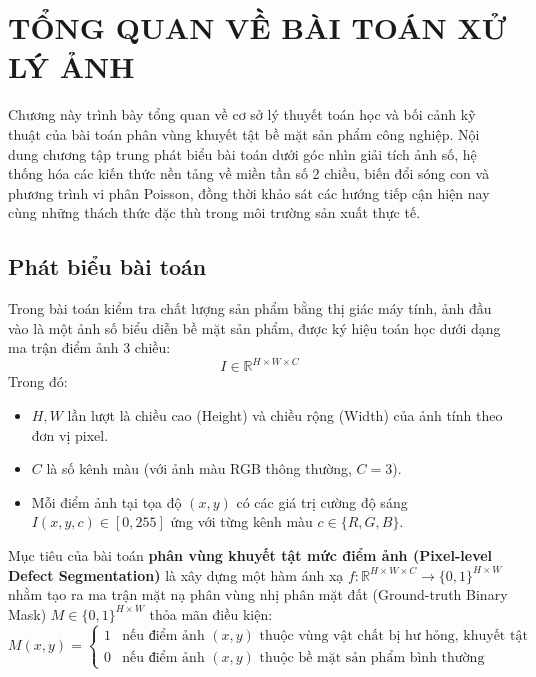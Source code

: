 \chapter{TỔNG QUAN VỀ BÀI TOÁN XỬ LÝ ẢNH}

Chương này trình bày tổng quan về cơ sở lý thuyết toán học và bối cảnh kỹ thuật của bài toán phân vùng khuyết tật bề mặt sản phẩm công nghiệp. Nội dung chương tập trung phát biểu bài toán dưới góc nhìn giải tích ảnh số, hệ thống hóa các kiến thức nền tảng về miền tần số 2 chiều, biến đổi sóng con và phương trình vi phân Poisson, đồng thời khảo sát các hướng tiếp cận hiện nay cùng những thách thức đặc thù trong môi trường sản xuất thực tế.

\section{Phát biểu bài toán}

Trong bài toán kiểm tra chất lượng sản phẩm bằng thị giác máy tính, ảnh đầu vào là một ảnh số biểu diễn bề mặt sản phẩm, được ký hiệu toán học dưới dạng ma trận điểm ảnh 3 chiều:
\begin{equation}
    I \in \mathbb{R}^{H \times W \times C}
\end{equation}
Trong đó:
\begin{itemize}
    \item $H, W$ lần lượt là chiều cao (Height) và chiều rộng (Width) của ảnh tính theo đơn vị pixel.
    \item $C$ là số kênh màu (với ảnh màu RGB thông thường, $C = 3$).
    \item Mỗi điểm ảnh tại tọa độ $(x, y)$ có các giá trị cường độ sáng $I(x, y, c) \in [0, 255]$ ứng với từng kênh màu $c \in \{R, G, B\}$.
\end{itemize}

Mục tiêu của bài toán \textbf{phân vùng khuyết tật mức điểm ảnh (Pixel-level Defect Segmentation)} là xây dựng một hàm ánh xạ $f: \mathbb{R}^{H \times W \times C} \to \{0, 1\}^{H \times W}$ nhằm tạo ra ma trận mặt nạ phân vùng nhị phân mặt đất (Ground-truth Binary Mask) $M \in \{0, 1\}^{H \times W}$ thỏa mãn điều kiện:
\begin{equation}
    M(x, y) = \begin{cases} 
    1 & \text{nếu điểm ảnh } (x, y) \text{ thuộc vùng vật chất bị hư hỏng, khuyết tật} \\ 
    0 & \text{nếu điểm ảnh } (x, y) \text{ thuộc bề mặt sản phẩm bình thường} 
    \end{cases}
\end{equation}

